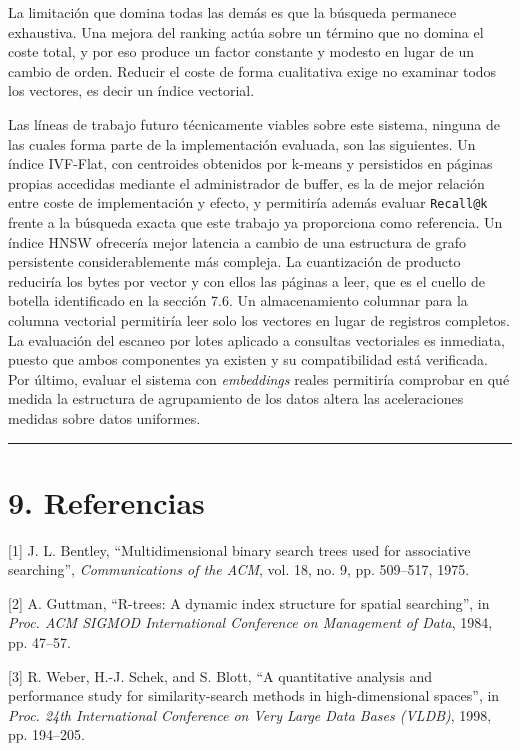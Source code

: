 \documentclass[11pt,a4paper]{article}
\let\subsection\section
\begin{document}
La limitación que domina todas las demás es que la búsqueda permanece
exhaustiva. Una mejora del ranking actúa sobre un término que no domina
el coste total, y por eso produce un factor constante y modesto en lugar
de un cambio de orden. Reducir el coste de forma cualitativa exige no
examinar todos los vectores, es decir un índice vectorial.

Las líneas de trabajo futuro técnicamente viables sobre este sistema,
ninguna de las cuales forma parte de la implementación evaluada, son las
siguientes. Un índice IVF-Flat, con centroides obtenidos por k-means y
persistidos en páginas propias accedidas mediante el administrador de
buffer, es la de mejor relación entre coste de implementación y efecto,
y permitiría además evaluar \texttt{Recall@k} frente a la búsqueda
exacta que este trabajo ya proporciona como referencia. Un índice HNSW
ofrecería mejor latencia a cambio de una estructura de grafo persistente
considerablemente más compleja. La cuantización de producto reduciría
los bytes por vector y con ellos las páginas a leer, que es el cuello de
botella identificado en la sección 7.6. Un almacenamiento columnar para
la columna vectorial permitiría leer solo los vectores en lugar de
registros completos. La evaluación del escaneo por lotes aplicado a
consultas vectoriales es inmediata, puesto que ambos componentes ya
existen y su compatibilidad está verificada. Por último, evaluar el
sistema con \emph{embeddings} reales permitiría comprobar en qué medida
la estructura de agrupamiento de los datos altera las aceleraciones
medidas sobre datos uniformes.

\begin{center}\rule{0.5\linewidth}{0.5pt}\end{center}

\subsection{9. Referencias}\label{9-referencias}

{[}1{]} J. L. Bentley, \enquote{Multidimensional binary search trees used for
associative searching}, \emph{Communications of the ACM}, vol. 18, no.
9, pp. 509--517, 1975.

{[}2{]} A. Guttman, \enquote{R-trees: A dynamic index structure for spatial
searching}, in \emph{Proc. ACM SIGMOD International Conference on
Management of Data}, 1984, pp. 47--57.

{[}3{]} R. Weber, H.-J. Schek, and S. Blott, \enquote{A quantitative analysis
and performance study for similarity-search methods in high-dimensional
spaces}, in \emph{Proc. 24th International Conference on Very Large Data
Bases (VLDB)}, 1998, pp. 194--205.
\end{document}
